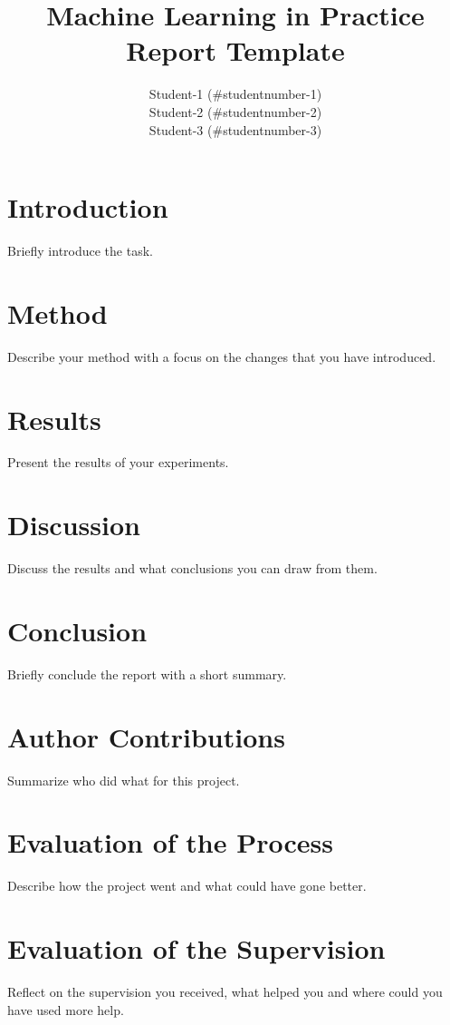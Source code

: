 \documentclass{article}
\begin{document}
\title{Machine Learning in Practice Report Template}
\author{Student-1 (\#studentnumber-1)\\
Student-2 (\#studentnumber-2)\\
Student-3 (\#studentnumber-3)}
\date{}
\maketitle

\section{Introduction}
Briefly introduce the task.
\section{Method}
Describe your method with a focus on the changes that you have introduced. 
\section{Results}
Present the results of your experiments.
\section{Discussion}
Discuss the results and what conclusions you can draw from them.
\section{Conclusion}
Briefly conclude the report with a short summary.
\section{Author Contributions}
Summarize who did what for this project.
\section{Evaluation of the Process}
Describe how the project went and what could have gone better.
\section{Evaluation of the Supervision}
Reflect on the supervision you received, what helped you and where could you have used more help.
\end{document}

